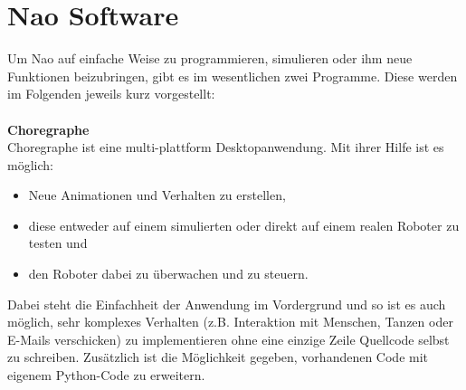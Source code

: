 \section{Nao Software}
Um Nao auf einfache Weise zu programmieren, simulieren oder ihm neue Funktionen beizubringen, gibt es im wesentlichen zwei Programme. Diese werden im Folgenden jeweils kurz vorgestellt:
\\
\\
\noindent
\textbf{Choregraphe} 
\\
Choregraphe ist eine multi-plattform Desktopanwendung. Mit ihrer Hilfe ist es möglich:
\begin{itemize}
\item Neue Animationen und Verhalten zu erstellen,
\item diese entweder auf einem simulierten  oder direkt auf einem realen Roboter zu testen und
\item den Roboter dabei zu überwachen und zu steuern.
\end{itemize}
Dabei steht die Einfachheit der Anwendung im Vordergrund und so ist es auch möglich, sehr komplexes Verhalten (z.B. Interaktion mit Menschen, Tanzen oder E-Mails verschicken) zu implementieren ohne eine einzige Zeile Quellcode selbst zu schreiben. Zusätzlich ist die Möglichkeit gegeben, vorhandenen Code mit eigenem Python-Code zu erweitern.

